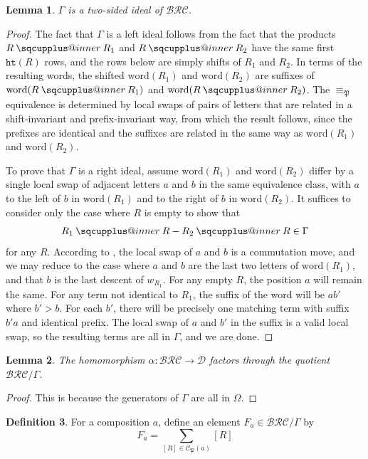 \documentclass{amsart}
\makeatletter
\newcommand{\sqcupplus@inner}[2]{%
  \vcenter{\hbox{\ooalign{%
    \hfil$\m@th#1\sqcup$\hfil\cr
    \hfil\raisebox{0.15ex}{$\m@th#1\scriptscriptstyle+$}\hfil\cr
  }}}%
}
\newcommand{\sqcupplus}{\mathbin{\mathpalette\sqcupplus@inner\relax}}
\newtheorem{lemma}{Lemma}[subsection]
\theoremstyle{definition}
\newtheorem{definition}[lemma]{Definition}
\theoremstyle{remark}
\numberwithin{equation}{subsection}
\newcommand{\wof}[1]{w_{#1}}
\newcommand{\hr}{\mathtt{ht}}
\newcommand{\BRC}{\mathcal{BRC}}
\newcommand{\dcoma}{\mathcal{D}}
\newcommand{\forest}{\mathfrak{P}}
\makeatother
\begin{document}
\begin{lemma} \label{lemma:forestideal}
  $\Gamma$ is a two-sided ideal of $\BRC$.
\end{lemma}
\begin{proof}
  The fact that $\Gamma$ is a left ideal follows from the fact that the products $R\sqcupplus R_1$ and $R\sqcupplus R_2$ have the same first $\hr(R)$ rows, and the rows below are simply shifts of $R_1$ and $R_2$. In terms of the resulting words, the shifted $\mathrm{word}(R_1)$ and $\mathrm{word}(R_2)$ are suffixes of $\mathrm{word}(R\sqcupplus R_1)$ and $\mathrm{word}(R\sqcupplus R_2)$. The $\equiv_\forest$ equivalence is determined by local swaps of pairs of letters that are related in a shift-invariant \cite[Proposition~5.8]{nadeau2024forest} and prefix-invariant \cite[Lemma~5.9]{nadeau2024forest} way, from which the result follows, since the prefixes are identical and the suffixes are related in the same way as $\mathrm{word}(R_1)$ and $\mathrm{word}(R_2)$.

  To prove that $\Gamma$ is a right ideal, assume $\mathrm{word}(R_1)$ and $\mathrm{word}(R_2)$ differ by a single local swap of adjacent letters $a$ and $b$ in the same equivalence class, with $a$ to the left of $b$ in $\mathrm{word}(R_1)$ and to the right of $b$ in $\mathrm{word}(R_2)$. It suffices to consider only the case where $R$ is empty to show that
  $$R_1\sqcupplus R - R_2\sqcupplus R\in \Gamma$$
  for any $R$. According to \cite{nadeau2024forest}, the local swap of $a$ and $b$ is a commutation move, and we may reduce to the case where $a$ and $b$ are the last two letters of $\mathrm{word}(R_1)$, and that $b$ is the last descent of $\wof{R_1}$. For any empty $R$, the position $a$ will remain the same. For any term not identical to $R_1$, the suffix of the word will be $ab'$ where $b'>b$. For each $b'$, there will be precisely one matching term with suffix $b'a$ and identical prefix. The local swap of $a$ and $b'$ in the suffix is a valid local swap, so the resulting terms are all in $\Gamma$, and we are done.
\end{proof}

\begin{lemma}
  The homomorphism $\alpha:\BRC\to\dcoma$ factors through the quotient $\BRC/\Gamma$.
\end{lemma}
\begin{proof}
This is because the generators of $\Gamma$ are all in $\Omega$.
\end{proof}

\begin{definition}
For a composition $a$, define  an element $F_a\in\BRC/\Gamma$ by
$$F_a =\sum_{[R]\in\mathcal{C}_\forest(a)} [R]$$
\end{definition}
\end{document}
